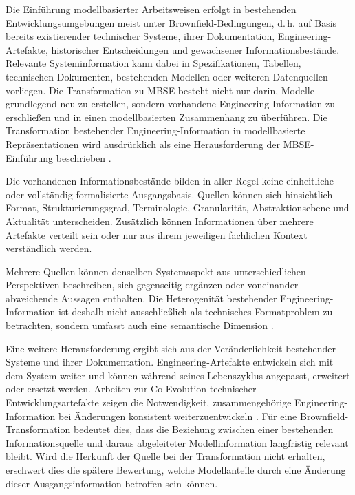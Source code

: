 Die Einführung modellbasierter Arbeitsweisen erfolgt in bestehenden
Entwicklungsumgebungen meist unter Brownfield-Bedingungen, d.\,h. auf Basis
bereits existierender technischer Systeme, ihrer Dokumentation,
Engineering-Artefakte, historischer Entscheidungen und gewachsener
Informationsbestände. Relevante Systeminformation kann dabei in
Spezifikationen, Tabellen, technischen Dokumenten, bestehenden Modellen oder
weiteren Datenquellen vorliegen. Die Transformation zu MBSE besteht nicht nur
darin, Modelle grundlegend neu zu erstellen, sondern vorhandene
Engineering-Information zu erschließen und in einen modellbasierten
Zusammenhang zu überführen. Die Transformation bestehender
Engineering-Information in modellbasierte Repräsentationen wird ausdrücklich
als eine Herausforderung der MBSE-Einführung beschrieben
\cite{Maheshwari2018,Henderson2024}.

Die vorhandenen Informationsbestände bilden in aller Regel keine einheitliche
oder vollständig formalisierte Ausgangsbasis. Quellen können sich hinsichtlich
Format, Strukturierungsgrad, Terminologie, Granularität, Abstraktionsebene und
Aktualität unterscheiden. Zusätzlich können Informationen über mehrere
Artefakte verteilt sein oder nur aus ihrem jeweiligen fachlichen Kontext
verständlich werden. 

\noindent
Mehrere Quellen können denselben Systemaspekt aus
unterschiedlichen Perspektiven beschreiben, sich gegenseitig ergänzen oder
voneinander abweichende Aussagen enthalten. Die Heterogenität bestehender
Engineering-Information ist deshalb nicht ausschließlich als technisches
Formatproblem zu betrachten, sondern umfasst auch eine semantische Dimension
\cite{Bressan.2000}.

Eine weitere Herausforderung ergibt sich aus der Veränderlichkeit bestehender
Systeme und ihrer Dokumentation. Engineering-Artefakte entwickeln sich mit dem
System weiter und können während seines Lebenszyklus angepasst, erweitert oder
ersetzt werden. Arbeiten zur Co-Evolution technischer Entwicklungsartefakte
zeigen die Notwendigkeit, zusammengehörige Engineering-Information bei
Änderungen konsistent weiterzuentwickeln \cite{Legat2014}. Für eine
Brownfield-Transformation bedeutet dies, dass die Beziehung zwischen einer
bestehenden Informationsquelle und daraus abgeleiteter Modellinformation
langfristig relevant bleibt. Wird die Herkunft der Quelle bei der
Transformation nicht erhalten, erschwert dies die spätere Bewertung, welche
Modellanteile durch eine Änderung dieser Ausgangsinformation betroffen sein
können.

